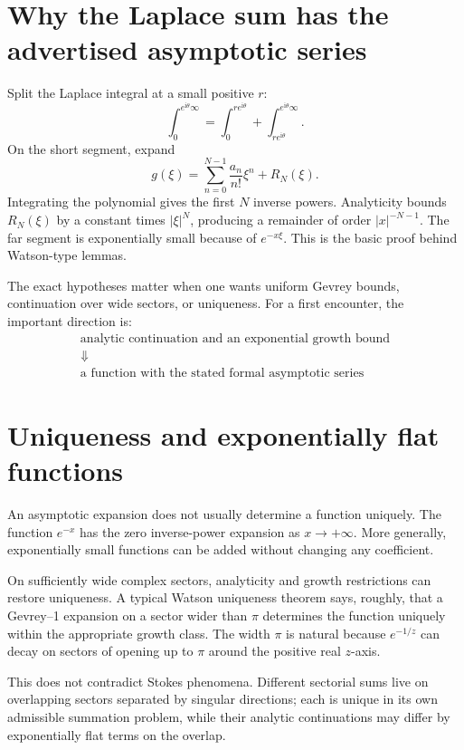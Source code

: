 \documentclass[11pt,openany]{book}
\theoremstyle{definition}
\theoremstyle{plain}
\theoremstyle{remark}
\newcommand{\ii}{\mathrm{i}}
\begin{document}
\section{Why the Laplace sum has the advertised asymptotic series}

Split the Laplace integral at a small positive $r$:
\[
 \int_0^{e^{\ii\theta}\infty}
 =\int_0^{re^{\ii\theta}}+\int_{re^{\ii\theta}}^{e^{\ii\theta}\infty}.
\]
On the short segment, expand
\[
 g(\xi)=\sum_{n=0}^{N-1}\frac{a_n}{n!}\xi^n+R_N(\xi).
\]
Integrating the polynomial gives the first $N$ inverse powers. Analyticity bounds $R_N(\xi)$ by a constant times $|\xi|^N$, producing a remainder of order $|x|^{-N-1}$. The far segment is exponentially small because of $e^{-x\xi}$. This is the basic proof behind Watson-type lemmas.

The exact hypotheses matter when one wants uniform Gevrey bounds, continuation over wide sectors, or uniqueness. For a first encounter, the important direction is:
\[
 \boxed{\begin{gathered}
  \text{analytic continuation and an exponential growth bound}\\[-0.2ex]
  \Downarrow\\[-0.2ex]
  \text{a function with the stated formal asymptotic series}
 \end{gathered}}
\]

\section{Uniqueness and exponentially flat functions}

An asymptotic expansion does not usually determine a function uniquely. The function $e^{-x}$ has the zero inverse-power expansion as $x\to+\infty$. More generally, exponentially small functions can be added without changing any coefficient.

On sufficiently wide complex sectors, analyticity and growth restrictions can restore uniqueness. A typical Watson uniqueness theorem says, roughly, that a Gevrey--1 expansion on a sector wider than $\pi$ determines the function uniquely within the appropriate growth class. The width $\pi$ is natural because $e^{-1/z}$ can decay on sectors of opening up to $\pi$ around the positive real $z$-axis.

This does not contradict Stokes phenomena. Different sectorial sums live on overlapping sectors separated by singular directions; each is unique in its own admissible summation problem, while their analytic continuations may differ by exponentially flat terms on the overlap.
\end{document}
